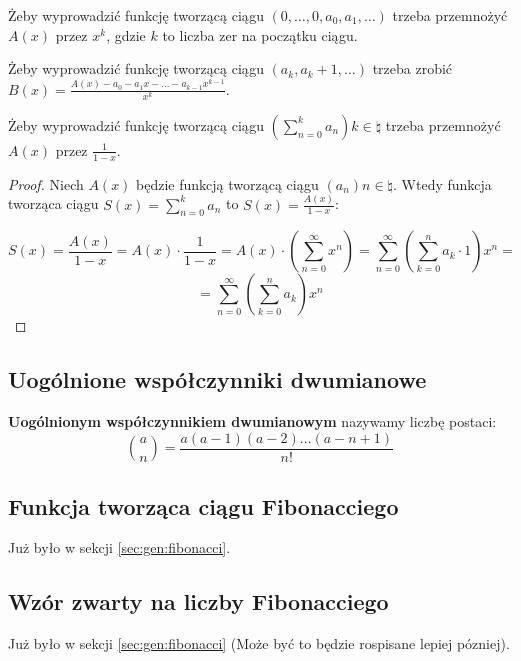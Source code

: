 Żeby wyprowadzić funkcję tworzącą ciągu \((0, \ldots , 0, a_0, a_1, \ldots)\) trzeba przemnożyć \(A(x)\) przez \(x^k\), gdzie \(k\) to liczba zer na początku ciągu.

Żeby wyprowadzić funkcję tworzącą ciągu \((a_k, a_k+1, \ldots)\) trzeba zrobić \( B(x) = \frac{A(x) - a_0 - a_1 x - \ldots - a_{k-1} x^{k-1}}{x^k} \).

Żeby wyprowadzić funkcję tworzącą ciągu \((\sum_{n=0}^k a_n)k \in \natural\) trzeba przemnożyć \(A(x)\) przez \(\frac{1}{1-x}\).

\begin{proof}
    Niech \(A(x)\) będzie funkcją tworzącą ciągu \((a_n) n \in \natural\). Wtedy funkcja tworząca ciągu \(S(x) = \sum_{n=0}^k a_n \) to $S(x) = \frac{A(x)}{1-x}$:

    $$ S(x) = \frac{A(x)}{1-x} = A(x) \cdot \frac{1}{1-x} = A(x) \cdot \left(\sum_{n=0}^{\infty} x^n\right) = \sum_{n=0}^{\infty} \left(\sum_{k=0}^{n} a_k \cdot 1 \right) x^n = $$
    $$ = \sum_{n=0}^{\infty} \left(\sum_{k=0}^{n} a_k \right) x^n $$

\end{proof}
   
\subsection{Uogólnione współczynniki dwumianowe}

\begin{definition}
    \textbf{Uogólnionym współczynnikiem dwumianowym} nazywamy liczbę postaci:
    \begin{equation*}
        \binom{a}{n} = \frac{a(a-1)(a-2) \ldots (a-n+1)}{n!}
    \end{equation*}
\end{definition}

\subsection{Funkcja tworząca ciągu Fibonacciego}


Już było w sekcji \ref{sec:gen:fibonacci}.

\subsection{Wzór zwarty na liczby Fibonacciego}

Już było w sekcji \ref{sec:gen:fibonacci} (Może być to będzie rospisane lepiej pózniej).